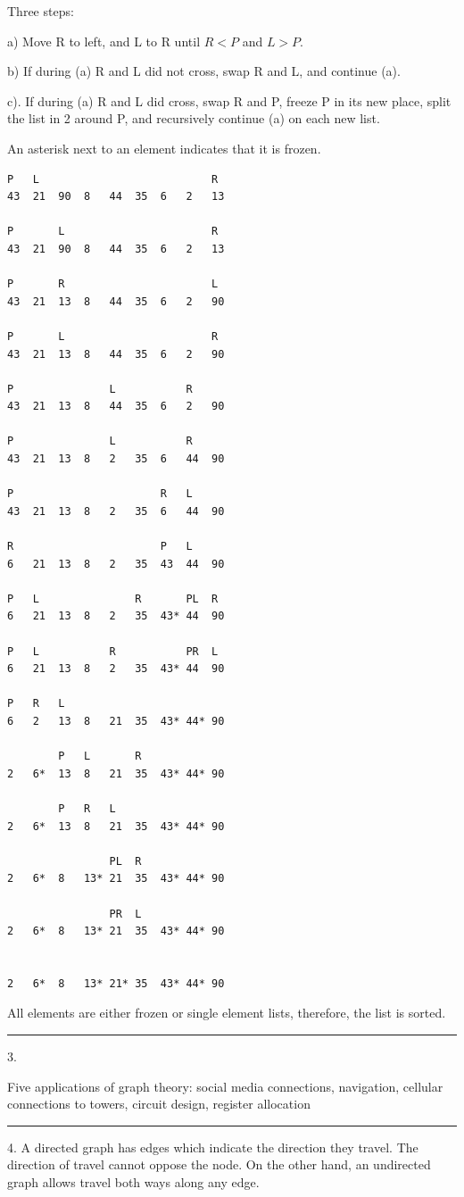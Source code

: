 \documentclass{article}
\begin{document}
Three steps:

a) Move R to left, and L to R until $R<P$ and $L>P$. 

b) If during (a) R and L did not cross, swap R and L, and continue (a). 

c). If during (a) R and L did cross, swap R and P, freeze P in its new place, split the list in 2 around P, and recursively continue (a) on each new list. 

An asterisk next to an element indicates that it is frozen. 

\begin{lstlisting}
P 	L 							R
43	21	90	8	44	35	6	2	13

P 		L 						R
43	21	90	8	44	35	6	2	13

P 		R 						L
43	21	13	8	44	35	6	2	90

P 		L 						R
43	21	13	8	44	35	6	2	90

P 		 		L			R	
43	21	13	8	44	35	6	2	90

P 		 		L			R	
43	21	13	8	2	35	6	44	90

P 		 				R	L	
43	21	13	8	2	35	6	44	90

R 		 				P	L	
6	21	13	8	2	35	43	44	90

P	L	 			R		PL	R
6	21	13	8	2	35	43*	44	90

P	L	 		R			PR	L
6	21	13	8	2	35	43*	44	90

P	R	L 						
6	2	13	8	21	35	43*	44*	90

		P 	L		R			
2	6*	13	8	21	35	43*	44*	90

		P 	R	L				
2	6*	13	8	21	35	43*	44*	90

		 		PL	R			
2	6*	8	13*	21	35	43*	44*	90

		 		PR	L			
2	6*	8	13*	21	35	43*	44*	90

		 						
2	6*	8	13*	21*	35	43*	44*	90

\end{lstlisting}

All elements are either frozen or single element lists, therefore, the list is sorted. 

\noindent\rule{8cm}{0.4pt}

3. 

Five applications of graph theory: social media connections, navigation, cellular connections to towers, circuit design, register allocation

\noindent\rule{8cm}{0.4pt}


4. 
A directed graph has edges which indicate the direction they travel. The direction of travel cannot oppose the node. On the other hand, an undirected graph allows travel both ways along any edge. 
\end{document}
